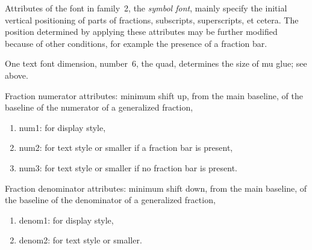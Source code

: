 \documentclass[twoside,letterpaper,openright]{rapport3}
\begin{document}
Attributes of the font in family~2, the \emph{symbol font},
mainly specify the
initial vertical positioning
of parts of fractions, subscripts, superscripts, et cetera.
The position determined by applying these
attributes may be further modified because of other
conditions, for example the presence of a fraction bar.

One text font dimension, number~6,
the quad, determines the size of mu glue;
see above.

Fraction numerator attributes: minimum shift up, from
the main baseline, of the baseline of the numerator
of a generalized fraction,
\begin{enumerate} %
\item num1:
 for display style,
\item num2:
 for text style or smaller if a fraction bar is present,
\item num3:
 for text style or smaller if no fraction bar is present.
\end{enumerate}

Fraction denominator attributes: minimum shift down, from
the main baseline, of the baseline of the denominator
of a generalized fraction,
\begin{enumerate} %
\item denom1:
for display style,
\item denom2:
for text style or smaller.
\end{enumerate}
\end{document}
